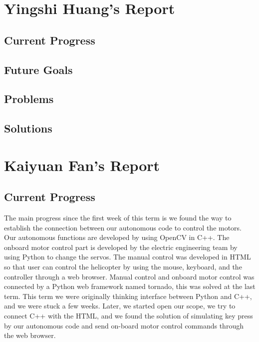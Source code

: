 \documentclass[onecolumn, draftclsnofoot,10pt, compsoc]{IEEEtran}
\begin{document}
\section{Yingshi Huang's Report}

\subsection{Current Progress}

\subsection{Future Goals}

\subsection{Problems}

\subsection{Solutions}





\section{Kaiyuan Fan's Report}

\subsection{Current Progress}

The main progress since the first week of this term is we found the way to establish the connection between our autonomous code to control the motors. Our autonomous functions are developed by using OpenCV in C++. The onboard motor control part is developed by the electric engineering team by using Python to change the servos. The manual control was developed in HTML so that user can control the helicopter by using the mouse, keyboard, and the controller through a web browser. Manual control and onboard motor control was connected by a Python web framework named tornado, this was solved at the last term. This term we were originally thinking interface between Python and C++, and we were stuck a few weeks. Later, we started open our scope, we try to connect C++ with the HTML, and we found the solution of simulating key press by our autonomous code and send on-board motor control commands through the web browser.
\end{document}
